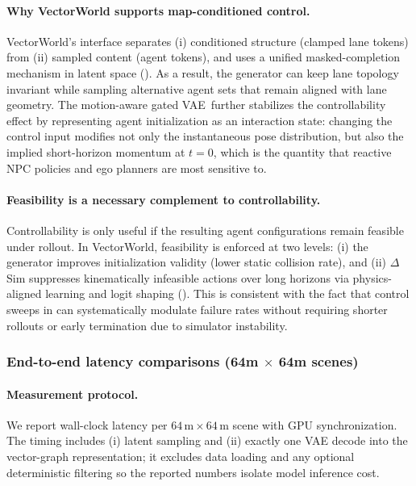 \documentclass{article}
\newcommand{\MotionVAE}{motion-aware gated VAE}
\theoremstyle{plain}
\theoremstyle{definition}
\theoremstyle{remark}
\begin{document}
\paragraph{Why VectorWorld supports map-conditioned control.}
VectorWorld’s interface separates (i) conditioned structure (clamped lane tokens) from (ii) sampled content (agent tokens),
and uses a unified masked-completion mechanism in latent space ().
As a result, the generator can keep lane topology invariant while sampling alternative agent sets that remain aligned with lane geometry.
The \MotionVAE\ further stabilizes the controllability effect by representing agent initialization as an interaction state:
changing the control input modifies not only the instantaneous pose distribution, but also the implied short-horizon momentum at \(t=0\),
which is the quantity that reactive NPC policies and ego planners are most sensitive to.

\paragraph{Feasibility is a necessary complement to controllability.}
Controllability is only useful if the resulting agent configurations remain feasible under rollout.
In VectorWorld, feasibility is enforced at two levels:
(i) the generator improves initialization validity (lower static collision rate), and
(ii) \(\Delta\)Sim suppresses kinematically infeasible actions over long horizons via physics-aligned learning and logit shaping
().
This is consistent with the fact that control sweeps in  can systematically modulate failure rates
without requiring shorter rollouts or early termination due to simulator instability.

\subsubsection{End-to-end latency comparisons (64m \(\times\) 64m scenes)}
\label{app:vis:latency}

\paragraph{Measurement protocol.}
We report wall-clock latency per \(64\,\mathrm{m}\times 64\,\mathrm{m}\) scene with GPU synchronization.
The timing includes (i) latent sampling and (ii) exactly one VAE decode into the vector-graph representation; it excludes data loading and any optional deterministic filtering so the reported numbers isolate model inference cost.
\end{document}
